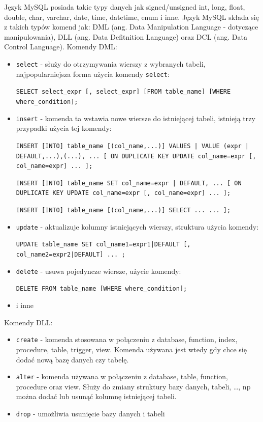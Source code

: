 \documentclass[eng,printmode,oneside]{mgr}
\begin{document}
Język MySQL posiada takie typy danych jak signed/unsigned int, long, float,
double, char, varchar, date, time, datetime, enum i inne. Język MySQL składa się
z takich typów komend jak: DML (ang.
Data Manipulation Language - dotyczące manipulowania), DLL (ang. Data
Defitnition Language) oraz DCL (ang. Data Control Language).
Komendy DML:
\begin{itemize}
  \item \texttt{select} - służy do otrzymywania wierszy z wybranych tabeli,
  najpopularniejsza forma użycia komendy \texttt{select}:
    
  \texttt{SELECT select\_expr [, select\_expr] [FROM table\_name] [WHERE
  where\_condition];}
  
  \item \texttt{insert} - komenda ta wstawia nowe wiersze do istniejącej tabeli,
  istnieją trzy przypadki użycia tej komendy:
  
  \texttt{INSERT [INTO] table\_name [(col\_name,...)]
    {VALUES | VALUE} ({expr | DEFAULT},...),\newline (...), ...
    [ ON DUPLICATE KEY UPDATE
      col\_name=expr
        [, col\_name=expr] ... ];} 
  
  \texttt{INSERT [INTO] table\_name SET col\_name={expr | DEFAULT}, ... [ ON
  DUPLICATE KEY \newline UPDATE col\_name=expr [, col\_name=expr] ... ];}
      
   \texttt{INSERT [INTO] table\_name [(col\_name,...)]
    SELECT ... \newline[ ON DUPLICATE KEY UPDATE
      col\_name=expr
        [, col\_name=expr] ... ];}
  
  \item \texttt{update} - aktualizuje kolumny istniejących wierszy,
  struktura użycia komendy:
  
  \texttt{UPDATE table\_name
    SET col\_name1={expr1|DEFAULT} [, col\_name2={expr2|DEFAULT}] ...
    ;}
  
  \item \texttt{delete} - usuwa pojedyncze wiersze, użycie komendy:
  
  \texttt{DELETE FROM table\_name [WHERE where\_condition];}
  
  \item i inne
\end{itemize}
Komendy DLL:
\begin{itemize}
  \item \texttt{create} - komenda stosowana w połączeniu z database, function,
  index, procedure, table, trigger, view. Komenda używana jest wtedy gdy chce
  się dodać nową bazę danych czy tabelę. 
  \item \texttt{alter} - komenda używana w połączeniu z database, table,
  function, procedure oraz view. Służy do zmiany struktury bazy danych, tabeli,
  \ldots, np można dodać lub usunąć kolumnę istniejącej tabeli.
  \item \texttt{drop} - umożliwia usunięcie bazy danych i tabeli
\end{itemize}
\end{document}
